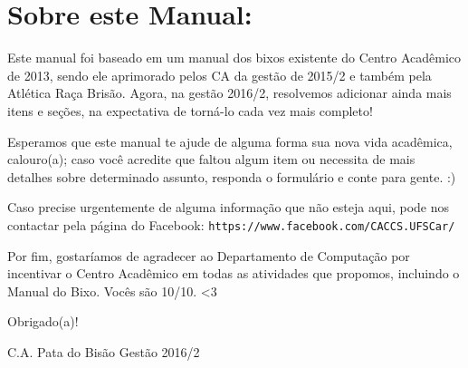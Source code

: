 \section{Sobre este Manual:}
Este manual foi baseado em um manual dos bixos existente do Centro Acadêmico de 2013, sendo ele aprimorado pelos CA da gestão de 2015/2 e também pela Atlética Raça Brisão. Agora, na gestão 2016/2, resolvemos adicionar ainda mais itens e seções, na expectativa de torná-lo cada vez mais completo!

Esperamos que este manual te ajude de alguma forma sua nova vida acadêmica, calouro(a); caso você acredite que faltou algum item ou necessita de mais detalhes sobre determinado assunto, responda o formulário e conte para gente. :)

Caso precise urgentemente de alguma informação que não esteja aqui, pode nos contactar pela página do Facebook: \texttt{https://www.facebook.com/CACCS.UFSCar/}

Por fim, gostaríamos de agradecer ao Departamento de Computação por incentivar o Centro Acadêmico em todas as atividades que propomos, incluindo o Manual do Bixo. Vocês são 10/10. <3 

\begin{flushright}
  Obrigado(a)!

  C.A. Pata do Bisão Gestão 2016/2
\end{flushright}
